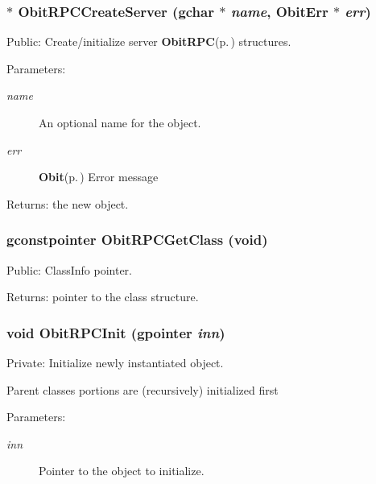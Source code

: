 \subsubsection{$\ast$ Obit\-RPCCreate\-Server (gchar $\ast$ {\em name}, {\bf Obit\-Err} $\ast$ {\em err})}\label{ObitRPC_8c_a10}


Public: Create/initialize server {\bf Obit\-RPC}{\rm (p.\,\pageref{structObitRPC})} structures. 

\begin{Desc}
\item[Parameters:]
\begin{description}
\item[{\em name}]An optional name for the object. \item[{\em err}]{\bf Obit}{\rm (p.\,\pageref{structObit})} Error message \end{description}
\end{Desc}
\begin{Desc}
\item[Returns:]the new object. \end{Desc}
\subsubsection{\setlength{\rightskip}{0pt plus 5cm}gconstpointer Obit\-RPCGet\-Class (void)}\label{ObitRPC_8c_a8}


Public: Class\-Info pointer. 

\begin{Desc}
\item[Returns:]pointer to the class structure. \end{Desc}
\subsubsection{\setlength{\rightskip}{0pt plus 5cm}void Obit\-RPCInit (gpointer {\em inn})}\label{ObitRPC_8c_a3}


Private: Initialize newly instantiated object. 

Parent classes portions are (recursively) initialized first \begin{Desc}
\item[Parameters:]
\begin{description}
\item[{\em inn}]Pointer to the object to initialize. \end{description}
\end{Desc}
